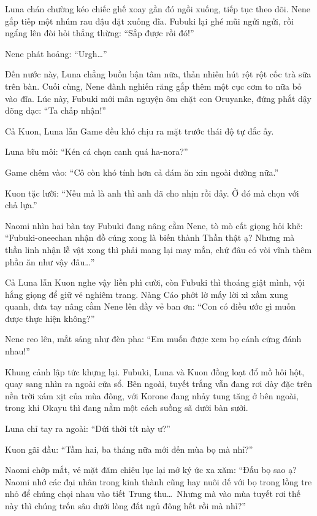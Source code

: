 \documentclass[../main.tex]{subfiles}
\begin{document}
Luna chán chường kéo chiếc ghế xoay gần đó ngồi xuống, tiếp tục theo dõi. Nene gắp tiếp một nhúm rau đậu đặt xuống đĩa. Fubuki lại ghé mũi ngửi ngửi, rồi ngẩng lên đòi hỏi thẳng thừng: ``Sắp được rồi đó!''

Nene phát hoảng: ``Urgh\dots''

Đến nước này, Luna chẳng buồn bận tâm nữa, thản nhiên hút rột rột cốc trà sữa trên bàn. Cuối cùng, Nene đành nghiến răng gắp thêm một cục cơm to nữa bỏ vào đĩa. Lúc này, Fubuki mới mãn nguyện ôm chặt con Oruyanke, đứng phắt dậy dõng dạc: ``Ta chấp nhận!''

Cả Kuon, Luna lẫn Game đều khó chịu ra mặt trước thái độ tự đắc ấy.

Luna bĩu môi: ``Kén cá chọn canh quá ha-nora?''

Game chêm vào: ``Cô còn khó tính hơn cả đám ăn xin ngoài đường nữa.''

Kuon tặc lưỡi: ``Nếu mà là anh thì anh đã cho nhịn rồi đấy. Ở đó mà chọn với chả lựa.''

Naomi nhìn hai bàn tay Fubuki đang nâng cằm Nene, tò mò cất giọng hỏi khẽ: ``Fubuki-oneechan nhận đồ cúng xong là biến thành Thần thật ạ? Nhưng mà thần linh nhận lễ vật xong thì phải mang lại may mắn, chứ đâu có vòi vĩnh thêm phần ăn như vậy đâu\dots''

Cả Luna lẫn Kuon nghe vậy liền phì cười, còn Fubuki thì thoáng giật mình, vội hắng giọng để giữ vẻ nghiêm trang. Nàng Cáo phớt lờ mấy lời xì xầm xung quanh, đưa tay nâng cằm Nene lên đầy vẻ ban ơn: ``Con có điều ước gì muốn được thực hiện không?''

Nene reo lên, mắt sáng như đèn pha: ``Em muốn được xem bọ cánh cứng đánh nhau!''

Khung cảnh lập tức khựng lại. Fubuki, Luna và Kuon đồng loạt đổ mồ hôi hột, quay sang nhìn ra ngoài cửa sổ. Bên ngoài, tuyết trắng vẫn đang rơi dày đặc trên nền trời xám xịt của mùa đông, với Korone đang nhảy tung tăng ở bên ngoài, trong khi Okayu thì đang nằm một cách suồng sã dưới bàn sưởi.


Luna chỉ tay ra ngoài: ``Dứi thời tít này ư?''

Kuon gãi đầu: ``Tầm hai, ba tháng nữa mới đến mùa bọ mà nhỉ?''

Naomi chớp mắt, vẻ mặt đăm chiêu lục lại mớ ký ức xa xăm: ``Đấu bọ sao ạ? Naomi nhớ các đại nhân trong kinh thành cũng hay nuôi dế với bọ trong lồng tre nhỏ để chúng chọi nhau vào tiết Trung thu\dots\ Nhưng mà vào mùa tuyết rơi thế này thì chúng trốn sâu dưới lòng đất ngủ đông hết rồi mà nhỉ?''
\end{document}
